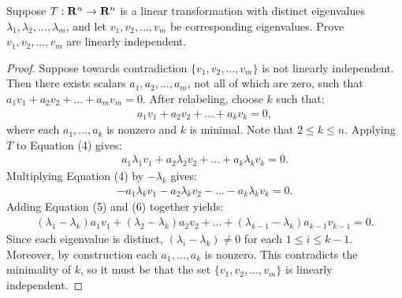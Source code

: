 \documentclass[10pt,twoside,openany]{memoir}
\begin{document}
\newpage
\begin{problem}[F23, P5]
    Suppose $T:\mathbf{R}^n \rightarrow \mathbf{R}^n$ is a linear transformation with distinct eigenvalues $\lambda_1,\lambda_2,...,\lambda_m$, and let $v_1,v_2,...,v_m$ be corresponding eigenvalues. Prove $v_1,v_2,...,v_m$ are linearly independent.
\end{problem}
    {\color{blue} \begin{proof}
        Suppose towards contradiction $\{v_1,v_2,...,v_m\}$ is not linearly independent. Then there exists scalars $a_1,a_2,...,a_m$, not all of which are zero, such that $a_1v_1 + a_2v_2 + ... + a_mv_m = 0$. After relabeling, choose $k$ such that:
            \begin{equation}
            \begin{split}
                a_1v_1 + a_2v_2 + ... + a_kv_k = 0,
            \end{split}
            \end{equation}
        where each $a_1,...,a_k$ is nonzero and $k$ is minimal. Note that $2 \leq k \leq n$. Applying $T$ to Equation (4) gives:
            \begin{equation}
            \begin{split}
                a_1 \lambda_1 v_1 + a_2 \lambda_2 v_2 + ... + a_k \lambda_k v_k = 0.
            \end{split}
            \end{equation}
        Multiplying Equation (4) by $-\lambda_k$ gives:
            \begin{equation}
            \begin{split}
                -a_1 \lambda_k v_1 - a_2 \lambda_k v_2 - ... - a_k\lambda_k v_k = 0.
            \end{split}
            \end{equation}
        Adding Equation (5) and (6) together yields:
            \begin{equation*}
            \begin{split}
                (\lambda_1 - \lambda_k)a_1v_1 + (\lambda_2 - \lambda_k)a_2 v_2 + ... + (\lambda_{k-1} - \lambda_k)a_{k-1} v_{k-1} = 0.
            \end{split}
            \end{equation*}
        Since each eigenvalue is distinct, $(\lambda_i - \lambda_k) \neq 0$ for each $1 \leq i \leq {k-1}$. Moreover, by construction each $a_1,...,a_k$ is nonzero. This contradicts the minimality of $k$, so it must be that the set $\{v_1,v_2,...,v_m\}$ is linearly independent.
    \end{proof}}
\end{document}
